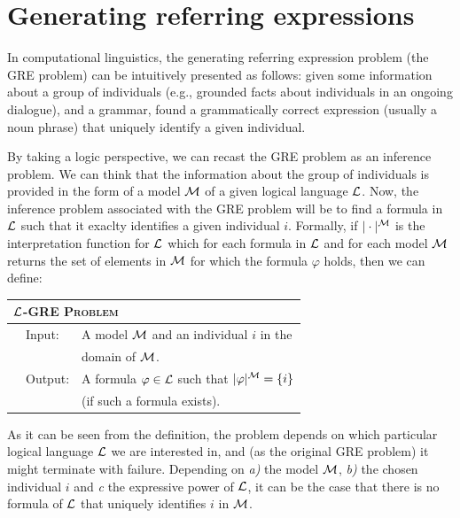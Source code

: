 \section{Generating referring expressions} \label{sec:gre}

In computational linguistics, the generating referring expression problem (the GRE
problem) can be intuitively presented as follows: given some information about
a group of individuals (e.g., grounded facts about individuals in an ongoing dialogue),
and a grammar, found a grammatically correct expression (usually a noun phrase) that uniquely identify a given individual.

By taking a logic perspective, we can recast the GRE problem as an inference problem.
We can think that the information about the group of individuals is provided in the form
of a model $\mathcal{M}$ of a given logical language $\mathcal{L}$.  Now, the inference problem
associated with the GRE problem will be to find a formula in $\mathcal{L}$ such that it
exaclty identifies a given individual $i$.  Formally, if $|\cdot|^{\mathcal{M}}$ is the interpretation
function for $\mathcal{L}$ which for each formula in $\mathcal{L}$ and for each model $\mathcal{M}$ returns
the set of elements in $\mathcal{M}$ for which the formula $\varphi$ holds, then we can define:
\medskip

\noindent
{\small
\begin{center}
\begin{tabular}{ll} \hline
\multicolumn{2}{l}{
\textsc{$\mathcal{L}$-GRE Problem}}\\ \hline
\ \ Input: & A model $\mathcal{M}$ and an individual $i$ in the\\
& \hspace*{0.5cm} domain of $\mathcal{M}$.\\
\ \ Output: & A formula $\varphi \in \mathcal{L}$ such that $|\varphi|^{\mathcal{M}} = \{i\}$\\
& \hspace*{0.5cm} (if such a formula exists).\\ \hline
\end{tabular}
\end{center}}
\medskip

As it can be seen from the definition, the problem depends on which particular
logical language $\mathcal{L}$ we are interested in, and (as the original GRE problem)
it might terminate with failure.  Depending on \emph{a)} the model $\mathcal{M}$,
\emph{b)} the chosen individual $i$
and \emph{c} the expressive power of $\mathcal{L}$, it can be the case that there is no formula of
$\mathcal{L}$ that uniquely identifies $i$ in $\mathcal{M}$.

